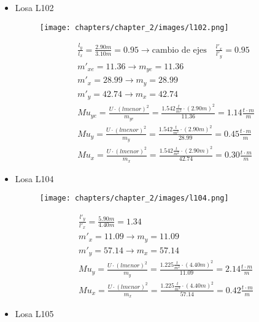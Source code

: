 \begin{enumerate}
\begin{itemize}
\newpage
\item Losa L102

\begin{figure}[H]
\begin{center}
     \texttt{[image: chapters/chapter\_2/images/l102.png]}
\end{center}
\end{figure}

\begin{align*}
& \frac{l_y}{l_x} = \frac{2.90m}{3.10m} = 0.95 \rightarrow \text{cambio de ejes} \quad \frac{l'_x}{l'_y} = 0.95\\
& m'_{xe} = 11.36 \rightarrow m_{ye} = 11.36 \\
& m'_x = 28.99 \rightarrow m_y = 28.99 \\
& m'_y= 42.74 \rightarrow m_x = 42.74 \\
& Mu_{ye} = \frac{U \cdot (lmenor)^2}{m_{ye}} = \frac{1.542 \frac{t}{m^2} \cdot (2.90m)^2}{11.36} = 1.14 \frac{t \cdot m}{m} \\
& Mu_y = \frac{U \cdot (lmenor)^2}{m_y} = \frac{1.542 \frac{t}{m^2} \cdot (2.90m)^2}{28.99} = 0.45 \frac{t \cdot m}{m} \\
& Mu_x = \frac{U \cdot (lmenor)^2}{m_x} = \frac{1.542 \frac{t}{m^2} \cdot (2.90m)^2}{42.74} = 0.30 \frac{t \cdot m}{m}
\end{align*}


\item Losa L104

\begin{figure}[H]
\begin{center}
     \texttt{[image: chapters/chapter\_2/images/l104.png]}
\end{center}
\end{figure}

\begin{align*}
& \frac{l'_y}{l'_x} = \frac{5.90m}{4.40m} = 1.34 \\
& m'_x = 11.09 \rightarrow m_y = 11.09 \\
& m'_y= 57.14 \rightarrow m_x = 57.14 \\
& Mu_y = \frac{U \cdot (lmenor)^2}{m_y} = \frac{1.225 \frac{t}{m^2} \cdot (4.40m)^2}{11.09} = 2.14 \frac{t \cdot m}{m} \\
& Mu_x = \frac{U \cdot (lmenor)^2}{m_x} = \frac{1.225 \frac{t}{m^2} \cdot (4.40m)^2}{57.14} = 0.42 \frac{t \cdot m}{m}
\end{align*}

\item Losa L105


\end{itemize}
\end{enumerate}
